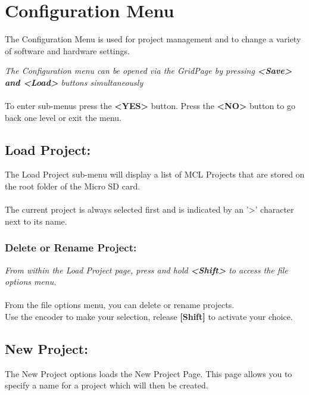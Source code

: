 \chapter{Configuration Menu}
The Configuration Menu is used for project management and to change a variety of software and hardware settings.


\textit{The Configuration menu can be opened via the GridPage by pressing \textbf{<Save> and <Load>} buttons simultaneously}\\\\
To enter sub-menus press the \textbf{<YES>} button. Press the \textbf{<NO>} button to go back one level or exit the menu.
\section{Load Project:}
The Load Project sub-menu will display a list of MCL Projects that are stored on the root folder of the Micro SD card.\\\\
The current project is always selected first and is indicated by an '>' character next to its name.

\subsection{Delete or Rename Project:}
\textit{From within the Load Project page, press and hold \textbf{<Shift>} to access the file options menu.}\\\\
From the file options menu, you can delete or rename projects.\\
Use the encoder to make your selection, release \textbf{[Shift]} to activate your choice.

\newpage
\section{New Project:}
The New Project options loads the New Project Page. This page allows you to specify a name for a project which will then be created.\\

